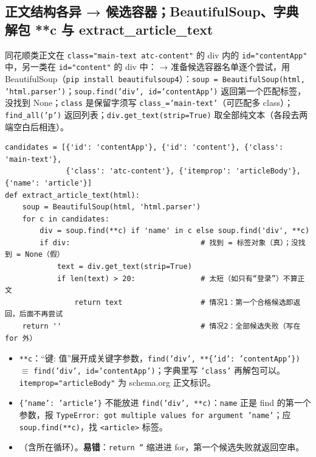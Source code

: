 \subsection{正文结构各异 → 候选容器；BeautifulSoup、字典解包 **c 与 extract\_article\_text}
同花顺类正文在 \texttt{class="main-text atc-content"} 的 div 内的 \texttt{id="contentApp"} 中，另一类在 \texttt{id="content"} 的 div 中： → 准备候选容器名单逐个尝试，用 BeautifulSoup（\texttt{pip install beautifulsoup4}）：\texttt{soup = BeautifulSoup(html, 'html.parser')}；\texttt{soup.find('div', id='contentApp')} 返回第一个匹配标签，没找到 None；\texttt{class} 是保留字须写 \texttt{class\_='main-text'}（可匹配多 class）；\texttt{find\_all('p')} 返回列表；\texttt{div.get\_text(strip=True)} 取全部纯文本（各段去两端空白后相连）。
\begin{lstlisting}[style=pyD07]
candidates = [{'id': 'contentApp'}, {'id': 'content'}, {'class': 'main-text'},
              {'class': 'atc-content'}, {'itemprop': 'articleBody'}, {'name': 'article'}]
def extract_article_text(html):
    soup = BeautifulSoup(html, 'html.parser')
    for c in candidates:
        div = soup.find(**c) if 'name' in c else soup.find('div', **c)
        if div:                              # 找到 = 标签对象（真）；没找到 = None（假）
            text = div.get_text(strip=True)
            if len(text) > 20:               # 太短（如只有“登录”）不算正文
                return text                  # 情况1：第一个合格候选即返回，后面不再尝试
    return ''                                # 情况2：全部候选失败（写在 for 外）
\end{lstlisting}
\begin{itemize}
\item {} \texttt{**c}：“键: 值”展开成关键字参数，\texttt{find('div', **\{'id': 'contentApp'\})} $\equiv$ \texttt{find('div', id='contentApp')}；字典里写 \texttt{'class'} 再解包可以。\texttt{itemprop="articleBody"} 为 schema.org 正文标识。
\item \texttt{\{'name': 'article'\}} 不能放进 \texttt{find('div', **c)}：\texttt{name} 正是 find 的第一个参数，报 \texttt{TypeError: got multiple values for argument 'name'}；应 \texttt{soup.find(**c)}，找 \texttt{<article>} 标签。
\item {}（含所在循环）。\textbf{易错}：\texttt{return ''} 缩进进 for，第一个候选失败就返回空串。
\end{itemize}

